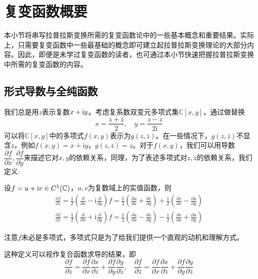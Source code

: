 \section{复变函数概要}\label{sec:Complex}

本小节将串写拉普拉斯变换所需的复变函数论中的一些基本概念和重要结果\cite{Function_Theory}。实际上，只需要复变函数中一些最基础的概念即可建立起拉普拉斯变换理论的大部分内容。因此，即便是未学过复变函数的读者，也可通过本小节快速把握拉普拉斯变换中所需的复变函数的内容。

\subsection{形式导数与全纯函数}\label{sub:derivative_and_holomorphic}
我们总是用$z$表示复数$x+\mathrm{i} y$。考虑复系数双变元多项式集$\mathbb{C}[x,y]$，通过做替换$$x=\frac{z+\overline{z}}{2},\quad y=\frac{z-\overline{z}}{2\mathrm{i}}$$
可以将$\mathbb{C}[x,y]$中的多项式$f(x,y)$表示为$g(z,\overline{z})$。在一些情况下，$g(z,\overline{z})$不显含$\overline{z}$，例如$f(x,y)=x+\mathrm{i}y$，$g(z,\overline{z})=z$。对于$f(x,y)$，我们可以用导数$\dfrac{\partial f}{\partial x},\dfrac{\partial f}{\partial y}$来描述它对$x,y$的依赖关系，同理，为了表述多项式对$z,\overline{z}$的依赖关系，我们定义:\begin{definition}[形式导数]
    设$f=u+\mathrm{i} v\in C^1(\mathbb{C})$，$u,v$为复数域上的实值函数，则
    \begin{align*}
        \frac{\partial f}{\partial z}=\frac{1}{2}\left(\frac{\partial}{\partial x}-\mathrm{i}\frac{\partial}{\partial y}\right)f=\frac{1}{2}\left(\frac{\partial u}{\partial x}+\frac{\partial v}{\partial y}\right)+\frac{\mathrm{i}}{2}\left(\frac{\partial v}{\partial x}-\frac{\partial u}{\partial y}\right)\\
        \frac{\partial f}{\partial \overline{z}}=\frac{1}{2}\left(\frac{\partial}{\partial x}+\mathrm{i}\frac{\partial}{\partial y}\right)f=\frac{1}{2}\left(\frac{\partial u}{\partial x}-\frac{\partial v}{\partial y}\right)-\frac{\mathrm{i}}{2}\left(\frac{\partial v}{\partial x}+\frac{\partial u}{\partial y}\right)
    \end{align*}
\end{definition}
注意$f$未必是多项式，多项式只是为了给我们提供一个直观的动机和理解方式。

这种定义可以视作复合函数求导的结果，即\[\frac{\partial f}{\partial z}=\frac{\partial f}{\partial x}\frac{\partial x}{\partial z}+\frac{\partial f}{\partial y}\frac{\partial y}{\partial z},\quad \frac{\partial f}{\partial \overline{z}}=\frac{\partial f}{\partial x}\frac{\partial x}{\partial \overline{z}}+\frac{\partial f}{\partial y}\frac{\partial y}{\partial \overline{z}}\]

